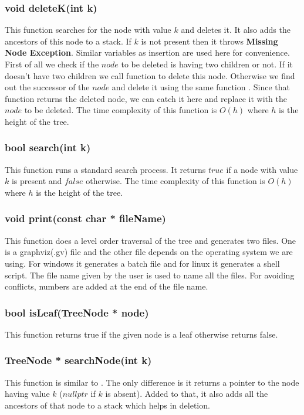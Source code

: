 \documentclass{article}
\begin{document}
\subsubsection{void deleteK(int k)}
\label{mainDel}
This function searches for the node with value $k$ and deletes it. It also adds the ancestors of this node to a stack. If $k$ is not present then it throws \textbf{Missing Node Exception}.\newline
Similar variables as insertion are used here for convenience.\newline
First of all we check if the $node$ to be deleted is having two children or not. If it doesn't have two children we call  function to delete this node. Otherwise we find out the successor of the $node$ and delete it using the same function . Since that function returns the deleted node, we can catch it here and replace it with the $node$ to be deleted.\newline
The time complexity of this function is $O(h)$ where $h$ is the height of the tree.

\subsubsection{bool search(int k)}
\label{search}
This function runs a standard search process. It returns $true$ if a node with value $k$ is present and $false$ otherwise. The time complexity of this function is $O(h)$ where $h$ is the height of the tree.

\subsubsection{void print(const char * fileName)}
This function does a level order traversal of the tree and generates two files. One is a graphviz(.gv) file and the other file depends on the operating system we are using. For windows it generates a batch file and for linux it generates a shell script. The file name given by the user is used to name all the files. For avoiding conflicts, numbers are added at the end of the file name.

\subsubsection{bool isLeaf(TreeNode * node)}
This function returns true if the given node is a leaf otherwise returns false.

\subsubsection{TreeNode * searchNode(int k)}
This function is similar to . The only difference is it returns a pointer to the node having value $k$ ($nullptr$ if $k$ is absent). Added to that, it also adds all the ancestors of that node to a stack which helps in deletion.
\end{document}
